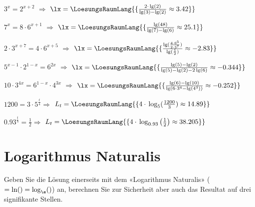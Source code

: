\begin{bbwAufgabenBlock}
\item $3^x=2^{x+2}$ $\Longrightarrow$ $\lx=\LoesungsRaumLang{\{\frac{2\cdot{}\lg(2)}{\lg(3)-\lg(2)} \approx  3.42  \}}$ \plz{}
\item $7^x=8\cdot{}6^{x+1}$ $\Longrightarrow$ $\lx=\LoesungsRaumLang{\{\frac{\lg(48)}{\lg(7)-\lg(6)} \approx 25.1   \}}$ \plz{}
\item $2\cdot{}3^{x+7}=4\cdot{}6^{x+5}$ $\Longrightarrow$ $\lx=\LoesungsRaumLang{\{\frac{\lg(\frac{4\cdot{}6^5}{2\cdot{}3^7})}{\lg(\frac12)} \approx  -2.83  \}}$ \plz{}
\item $5^{x-1}\cdot{}2^{1-x}=6^{2x}$ $\Longrightarrow$ $\lx=\LoesungsRaumLang{\{\frac{\lg(5)-\lg(2)}{\lg(5)-\lg(2)-2\lg(6)} \approx -0.344   \}}$ \plz{}
\item $10\cdot{}3^{4x} = 6^{1-x}\cdot{}4^{3x}$ $\Longrightarrow$ $\lx=\LoesungsRaumLang{\{\frac{\lg(6)-\lg(10)}{\lg(6\cdot{}3^4 - \lg(4^3))} \approx -0.252   \}}$ \plz{}

\newpage

\item $1200=3\cdot{} 5^{\frac{t}{4}} \Longrightarrow$ $L_t = \LoesungsRaumLang{\{ 4\cdot{}\log_5(\frac{1200}3)\approx 14.89   \}}$ \plz{}

\item $0.93^{\frac{t}4}=\frac12 \Longrightarrow$ $L_t
= \LoesungsRaumLang{\{
4\cdot{}\log_{0.93}\left(\frac12\right) \approx 38.205   \}}$ \plz{}

\end{bbwAufgabenBlock}

\platzFuerBerechnungenBisEndeSeite{}

\section{Logarithmus Naturalis}
Geben Sie die Lösung einerseits mit dem «Logarithmus Naturalis»
($=\ln() = \log_{\e}()$) an, berechnen Sie zur Sicherheit aber auch das
Resultat auf drei signifikante Stellen.


